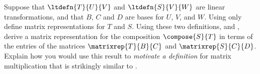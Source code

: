 Suppose that $\ltdefn{T}{U}{V}$ and $\ltdefn{S}{V}{W}$ are linear transformations, and that $B$, $C$ and $D$ are bases for $U$, $V$, and $W$.  Using only  define matrix representations for $T$ and $S$.  Using these two definitions, and , derive a matrix representation for the composition $\compose{S}{T}$ in terms of the entries of the matrices $\matrixrep{T}{B}{C}$ and $\matrixrep{S}{C}{D}$.  Explain how you would use this result to {\em motivate a definition} for matrix multiplication that is strikingly similar to .